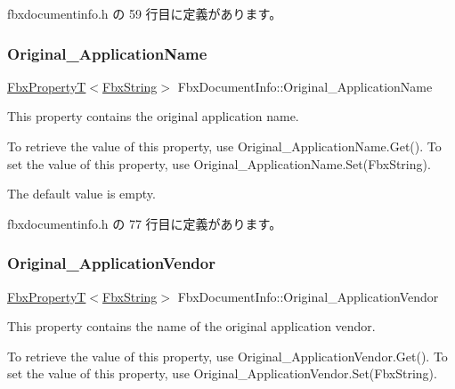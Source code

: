  fbxdocumentinfo.\+h の 59 行目に定義があります。

\mbox{\label{class_fbx_document_info_abcddf84735f7ceac288ed1990c837f25}} 
\subsubsection{\texorpdfstring{Original\+\_\+\+Application\+Name}{Original\_ApplicationName}}
{\footnotesize\ttfamily \hyperlink{class_fbx_property_t}{Fbx\+PropertyT}$<$\hyperlink{class_fbx_string}{Fbx\+String}$>$ Fbx\+Document\+Info\+::\+Original\+\_\+\+Application\+Name}

This property contains the original application name.

To retrieve the value of this property, use Original\+\_\+\+Application\+Name.\+Get(). To set the value of this property, use Original\+\_\+\+Application\+Name.\+Set(\+Fbx\+String).

The default value is empty. 

 fbxdocumentinfo.\+h の 77 行目に定義があります。

\mbox{\label{class_fbx_document_info_afe6f02a61f882355521e6f1e45de0a9e}} 
\subsubsection{\texorpdfstring{Original\+\_\+\+Application\+Vendor}{Original\_ApplicationVendor}}
{\footnotesize\ttfamily \hyperlink{class_fbx_property_t}{Fbx\+PropertyT}$<$\hyperlink{class_fbx_string}{Fbx\+String}$>$ Fbx\+Document\+Info\+::\+Original\+\_\+\+Application\+Vendor}

This property contains the name of the original application vendor.

To retrieve the value of this property, use Original\+\_\+\+Application\+Vendor.\+Get(). To set the value of this property, use Original\+\_\+\+Application\+Vendor.\+Set(\+Fbx\+String).

